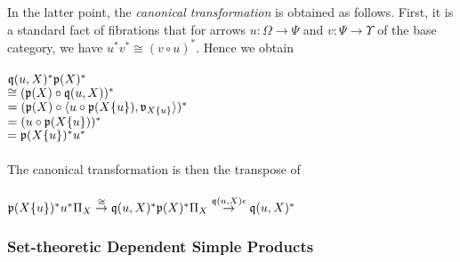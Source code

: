 \documentclass[sigplan,10pt,review,anonymous]{acmart}
\begin{document}
In the latter point, the \emph{canonical transformation} is obtained as follows. First, it is a standard fact of fibrations that for arrows $u : \Omega \to \Psi$ and $v : \Psi \to \Upsilon$ of the base category, we have $u^*v^* \cong (v \circ u)^*$. Hence we obtain \\~\\
$\frak q(u,X)^* \frak p(X)^*$\\
$\cong (\frak p(X) \circ \frak q(u,X))^*$\\ 
$= (\frak p(X) \circ \langle u \circ \frak p(X \{ u \}), \frak v_{X \{ u \}} \rangle)^*$\\
$= (u \circ \frak p(X \{ u \}))^*$\\
$= \frak p(X \{ u \})^* u^*$\\~\\
The canonical transformation is then the transpose of\\~\\
$\frak p(X \{u \})^* u^* \Pi_X \overset{\cong}{\to} \frak q(u,X)^* \frak p(X)^* \Pi_X \overset{\frak q(u,X) \epsilon}{\to} \frak q(u,X)^*$

\subsubsection{Set-theoretic Dependent Simple Products}
\end{document}
